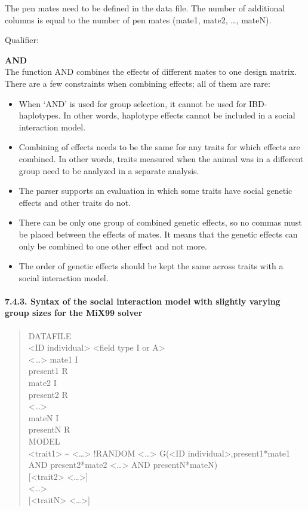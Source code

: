 The pen mates need to be defined in the data file. The number of
additional columns is equal to the number of pen mates (mate1, mate2,
\ldots, mateN).

Qualifier:

\textbf{AND}\\
The function AND combines the effects of different mates to one design
matrix. There are a few constraints when combining effects; all of them
are rare:

\begin{itemize}
\tightlist
\item
  When `AND' is used for group selection, it cannot be used for
  IBD-haplotypes. In other words, haplotype effects cannot be included
  in a social interaction model.
\item
  Combining of effects needs to be the same for any traits for which
  effects are combined. In other words, traits measured when the animal
  was in a different group need to be analyzed in a separate analysis.
\item
  The parser supports an evaluation in which some traits have social
  genetic effects and other traits do not.
\item
  There can be only one group of combined genetic effects, so no commas
  must be placed between the effects of mates. It means that the genetic
  effects can only be combined to one other effect and not more.
\item
  The order of genetic effects should be kept the same across traits
  with a social interaction model.
\end{itemize}

\paragraph{7.4.3. Syntax of the social interaction model with slightly
varying group sizes for the MiX99 solver}\label{Stat17}

\begin{quote}
DATAFILE\\
\textless ID individual\textgreater{} \textless field type I or
A\textgreater{}\\
\textless\ldots\textgreater{} mate1 I\\
present1 R\\
mate2 I\\
present2 R\\
\textless\ldots\textgreater{}\\
mateN I\\
presentN R\\
MODEL\\
\textless trait1\textgreater{} \textasciitilde{}
\textless\ldots\textgreater{} !RANDOM \textless\ldots\textgreater{}
G(\textless ID individual\textgreater,present1*mate1 AND present2*mate2
\textless\ldots\textgreater{} AND presentN*mateN)\\
{[}\textless trait2\textgreater{} \textless\ldots\textgreater{]}\\
\textless\ldots\textgreater{}\\
{[}\textless traitN\textgreater{} \textless\ldots\textgreater{]}
\end{quote}

